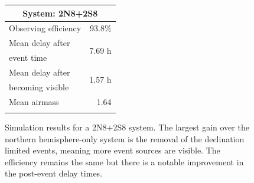 \begin{colsection}
\begin{colsection}
\begin{figure}[p]
\begin{center}
    \begin{minipage}[t]{0.35\textwidth}\vspace{0pt}
    \begin{tabular}{lr}
    \multicolumn{2}{c}{\textbf{System: 2N8+2S8}} \\
    \midrule
    Observing efficiency & 93.8\% \\
    \midrule
    Mean delay after     & \multirow{2}{*}{7.69 h} \\
    event time           & \\
    Mean delay after     & \multirow{2}{*}{1.57 h} \\
    becoming visible     & \\
    \midrule
    Mean airmass         & 1.64 \\
    & \\
    \end{tabular}
    \vfill
    \end{minipage}

    \end{center}
    \caption[GW simulation results: 2N8+2S8 system]{
        Simulation results for a 2N8+2S8 system. The largest gain over the northern hemisphere-only system is the removal of the declination limited events, meaning more event sources are visible. The efficiency remains the same but there is a notable improvement in the post-event delay times.
    }\label{fig:gw_sim_2n8+2s8}
\end{figure}


\begin{figure}[p]
    \begin{center}


\end{center}
\end{figure}
\end{colsection}
\end{colsection}
